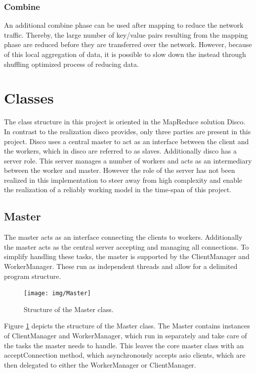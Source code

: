 \documentclass[12pt, letterpaper]{article}
\begin{document}
\subsubsection{Combine}
An additional combine phase can be used after mapping to reduce the network traffic. Thereby, the large number of key/value pairs resulting from the mapping phase are reduced before they are transferred over the network. However, because of this local aggregation of data, it is possible to slow down the instead through shuffling optimized process of reducing data.

\section{Classes}

The class structure in this project is oriented in the MapReduce solution Disco. In contrast to the realization disco provides, only three parties are present in this project. Disco uses a central master to act as an interface between the client and the workers, which in disco are referred to as slaves. Additionally disco has a server role. This server manages a number of workers and acts as an intermediary between the worker and master. However the role of the server has not been realized in this implementation to steer away from high complexity and enable the realization of a reliably working model in the time-span of this project.

\subsection{Master}

The master acts as an interface connecting the clients to workers. Additionally the master acts as the central server accepting and managing all connections. To simplify handling these tasks, the master is supported by the ClientManager and WorkerManager. These run as independent threads and allow for a delimited program structure.

\begin{figure}[h]
	\centering
	\texttt{[image: img/Master]}
	\caption{Structure of the Master class.}
	\label{fig:classes_Master}
\end{figure}

Figure \ref{fig:classes_Master} depicts the structure of the Master class. The Master contains instances of ClientManager and WorkerManager, which run in separately and take care of the tasks the master needs to handle. This leaves the core master class with an acceptConnection method, which asynchronously accepts asio clients, which are then delegated to either the WorkerManager or ClientManager.    
\end{document}
